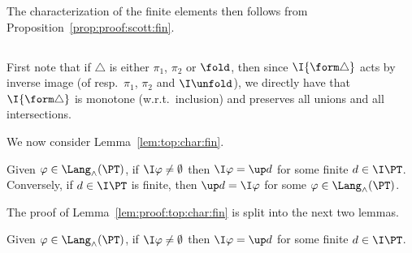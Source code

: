 The characterization of the finite elements then follows from
Proposition~\ref{prop:proof:scott:fin}.





\subsection{}
\label{sec:proof:sem:log}

First note that if $\triangle$ is either $\pi_1$, $\pi_2$ or $\fold$,
then
since $\I{\form\triangle}$ acts by inverse image
(of resp.\ $\pi_1$, $\pi_2$ and $\I\unfold$), we directly
have that $\I{\form\triangle}$
is monotone (w.r.t.\ inclusion) and preserves all unions and all intersections.

We now consider Lemma~\ref{lem:top:char:fin}.

\begin{lemma}
\label{lem:proof:top:char:fin}
Given $\varphi \in \Lang_\land(\PT)$, if $\I\varphi \neq \emptyset$ then
$\I\varphi = \up d$ for some finite $d \in \I\PT$.
Conversely, if $d \in \I\PT$ is finite, then $\up d = \I\varphi$ for some
$\varphi \in \Lang_{\land}(\PT)$.
\end{lemma}

The proof of Lemma~\ref{lem:proof:top:char:fin} is split into the next
two lemmas.

\begin{lemma}
\label{lem:proof:top:fin:compact-open}
Given $\varphi \in \Lang_\land(\PT)$, if $\I\varphi \neq \emptyset$ then
$\I\varphi = \up d$ for some finite $d \in \I\PT$.
\end{lemma}

